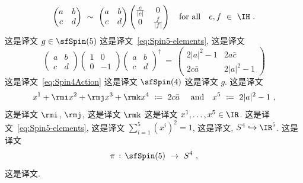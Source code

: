 \documentclass[
    affil-it, %
    auth-lg, %
    british, %
    compression, %
    contents, %
    custom-packages={}, %
    references={bigone}, %
]{lib/preprint}
\begin{document}
\begin{body}
\begin{equation}
            \begin{pmatrix}
                a & b
                \\
                c & d
            \end{pmatrix}\ \sim\ 
            \begin{pmatrix}
                a & b
                \\
                c & d
            \end{pmatrix}
            \begin{pmatrix}
                \frac{e}{|e|} & 0 
                \\
                0 & \frac{f}{|f|}
            \end{pmatrix}
            \eforall
            e,f\ \in\ \IH~.
        \end{equation}  这是译文 $g\in\sfSpin(5)$ 这是译文~\eqref{eq:Spin5-elements}, 这是译文         \begin{equation}
            \begin{pmatrix}
                a & b
                \\
                c & d
            \end{pmatrix}
            \begin{pmatrix}
                1 & 0
                \\
                0 & -1
            \end{pmatrix}
            \begin{pmatrix}
                a & b
                \\
                c & d
            \end{pmatrix}^\dagger
            \ = \
            \begin{pmatrix}
                2|a|^2-1 & 2a\bar c
                \\
                2 c\bar a & 2|a|^2-1
            \end{pmatrix}
        \end{equation}  这是译文~\eqref{eq:Spin4Action} 这是译文 $\sfSpin(4)$ 这是译文 $g$. 这是译文 
        \begin{equation}
            x^1+\rmi x^2+\rmj x^3+\rmk x^4\ \coloneqq\ 2 c\bar a~\eand
            x^5\ \coloneqq\ 2|a|^2-1~,
        \end{equation}  这是译文 $\rmi$, $\rmj$, 这是译文 $\rmk$ 这是译文 $x^1,\ldots,x^5\in\IR$. 这是译文~\eqref{eq:Spin5-elements}, 这是译文 $\sum_{i=1}^5(x^i)^2=1$, 这是译文, $S^4\hookrightarrow\IR^5$. 这是译文 
        \begin{equation}
            \pi\,:\,\sfSpin(5)\ \rightarrow\ S^4~,
        \end{equation}  这是译文. 
        

\end{body}
\end{document}
